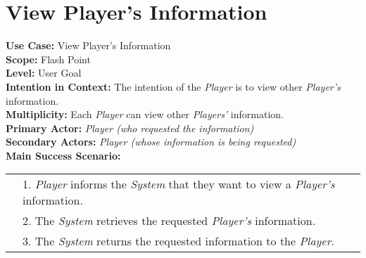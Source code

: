 \documentclass{article}
\begin{document}
	\section*{View Player's Information}
	\textbf{Use Case:} View Player's Information\\
	\textbf{Scope:} Flash Point\\
	\textbf{Level:} User Goal\\
	\textbf{Intention in Context:} The intention of the \textit{Player} is to view other \textit{Player's} information.\\
	\textbf{Multiplicity: }Each \textit{Player} can view other \textit{Players'} information.\\
	\textbf{Primary Actor:} \textit{Player (who requested the information)}\\
	\textbf{Secondary Actors:} \textit{Player (whose information is being requested)}\\
	\textbf{Main Success Scenario:}\\
	\begin{tabular}{l l}
		&1. \textit{Player} informs the \textit{System} that they want to view a \textit{Player's} information.\\
		&2. The \textit{System} retrieves the requested \textit{Player's} information.\\
		&3. The \textit{System} returns the requested information to the \textit{Player}.
	\end{tabular}
\end{document}
